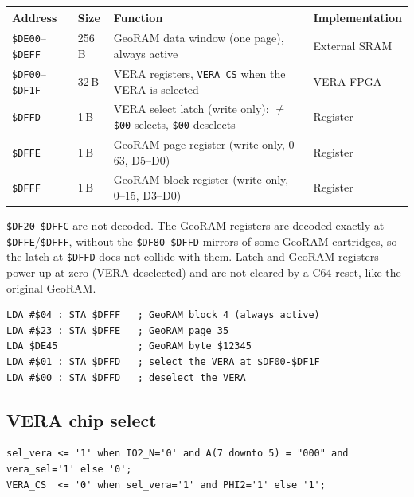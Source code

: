 \documentclass[11pt,a4paper]{article}
\newcommand{\sig}[1]{\texttt{#1}}
\newcommand{\file}[1]{\texttt{#1}}
\newcommand{\hex}[1]{\texttt{\$#1}}
\begin{document}
\begin{center}
\begin{tabular}{llp{5.2cm}l}
\toprule
\textbf{Address} & \textbf{Size} & \textbf{Function} & \textbf{Implementation} \\
\midrule
\hex{DE00}--\hex{DEFF} & 256\,B & GeoRAM data window (one page),
                                   always active & External SRAM \\
\hex{DF00}--\hex{DF1F} & 32\,B  & VERA registers, \sig{VERA\_CS}
                                   when the VERA is selected & VERA FPGA \\
\hex{DFFD}             & 1\,B   & VERA select latch (write only):
                                   $\neq$\,\texttt{\$00} selects,
                                   \texttt{\$00} deselects & Register \\
\hex{DFFE}             & 1\,B   & GeoRAM page register (write only,
                                   0--63, D5--D0) & Register \\
\hex{DFFF}             & 1\,B   & GeoRAM block register (write only,
                                   0--15, D3--D0) & Register \\
\bottomrule
\end{tabular}
\end{center}

\hex{DF20}--\hex{DFFC} are not decoded.  The GeoRAM registers are decoded
exactly at \hex{DFFE}/\hex{DFFF}, without the \hex{DF80}--\hex{DFFD}
mirrors of some GeoRAM cartridges, so the latch at \hex{DFFD} does not
collide with them.  Latch and GeoRAM registers power up at zero (VERA
deselected) and are not cleared by a C64 reset, like the original GeoRAM.

\begin{lstlisting}[style=shell,caption={Typical use from 6510 code}]
LDA #$04 : STA $DFFF   ; GeoRAM block 4 (always active)
LDA #$23 : STA $DFFE   ; GeoRAM page 35
LDA $DE45              ; GeoRAM byte $12345
LDA #$01 : STA $DFFD   ; select the VERA at $DF00-$DF1F
LDA #$00 : STA $DFFD   ; deselect the VERA
\end{lstlisting}

\subsection{VERA chip select}

\begin{lstlisting}[style=vhdl,caption={VERA decode in \file{C6502\_Interface.vhd}}]
sel_vera <= '1' when IO2_N='0' and A(7 downto 5) = "000" and vera_sel='1' else '0';
VERA_CS  <= '0' when sel_vera='1' and PHI2='1' else '1';
\end{lstlisting}
\end{document}
